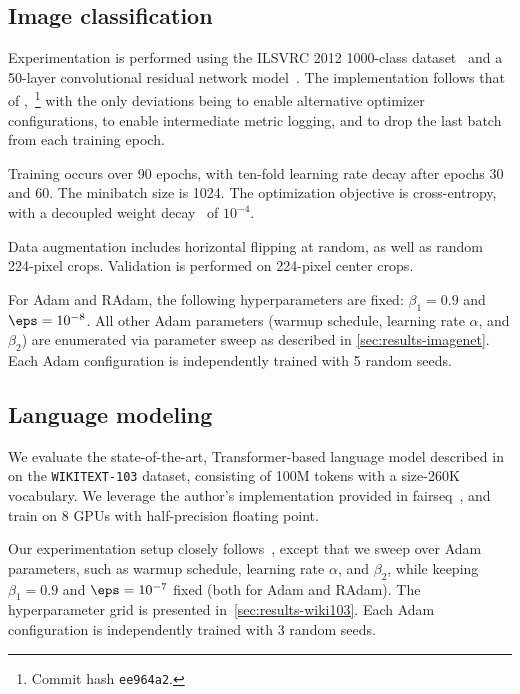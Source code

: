 {\subsection{Image classification}
\label{apx:training-details-imagenet}

Experimentation is performed using the ILSVRC 2012 1000-class dataset~\citep[``ImageNet'';][]{russakovsky2015imagenet} and a 50-layer convolutional residual network model~\citep[``ResNet-50'';][]{he2016resnet}. The implementation follows that of \citet{paszke2016pytorchexamples},~\footnote{Commit hash \texttt{ee964a2}.} with the only deviations being to enable alternative optimizer configurations, to enable intermediate metric logging, and to drop the last batch from each training epoch.

Training occurs over 90 epochs, with ten-fold learning rate decay after epochs 30 and 60. The minibatch size is 1024. The optimization objective is cross-entropy, with a decoupled weight decay~\citep{loshchilov2019adamw} of $10^{-4}$.

Data augmentation includes horizontal flipping at random, as well as random 224-pixel crops. Validation is performed on 224-pixel center crops.

For Adam and RAdam, the following hyperparameters are fixed: $\beta_1 = 0.9$ and $\eps = 10^{-8}$. All other Adam parameters (warmup schedule, learning rate $\alpha$, and $\beta_2$) are enumerated via parameter sweep as described in \cref*{sec:results-imagenet}. Each Adam configuration is independently trained with 5 random seeds.

\subsection{Language modeling}
\label{apx:training-details-wiki103}

We evaluate the state-of-the-art, Transformer-based language model described in~\cite{baevski2018adaptivelm} on the \texttt{WIKITEXT-103} dataset, consisting of 100M tokens with a size-260K vocabulary. We leverage the author's implementation provided in fairseq~\citep{gehring2017convs2s, ott2019fairseq}, and train on 8 GPUs with half-precision floating point.

Our experimentation setup closely follows~\cite{baevski2018adaptivelm}, except that we sweep over Adam parameters, such as warmup schedule, learning rate $\alpha$, and $\beta_2$, while keeping $\beta_1=0.9$ and $\eps=10^{-7}$ fixed (both for Adam and RAdam). The hyperparameter grid is presented in~\cref*{sec:results-wiki103}. Each Adam configuration is independently trained with 3 random seeds.

}
